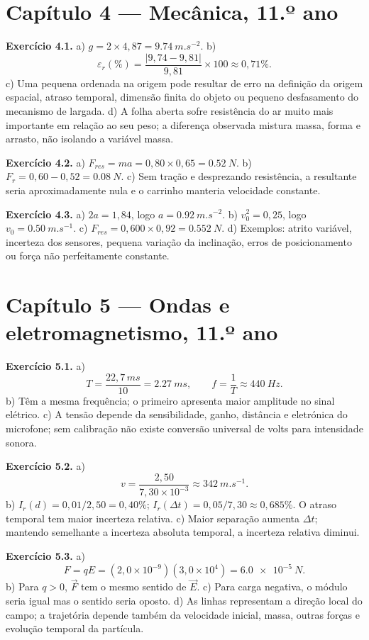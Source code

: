 \documentclass[11pt,a4paper,openany]{book}
\begin{document}
\section*{Capítulo 4 — Mecânica, 11.º ano}

\textbf{Exercício 4.1.} a) $g=2\times4,87=\SI{9.74}{m.s^{-2}}$. b)
\[
\varepsilon_r(\%)=\frac{|9,74-9,81|}{9,81}\times100\approx0,71\%.
\]
c) Uma pequena ordenada na origem pode resultar de erro na definição da origem espacial, atraso temporal, dimensão finita do objeto ou pequeno desfasamento do mecanismo de largada. d) A folha aberta sofre resistência do ar muito mais importante em relação ao seu peso; a diferença observada mistura massa, forma e arrasto, não isolando a variável massa.

\medskip
\textbf{Exercício 4.2.} a) $F_{res}=ma=0,80\times0,65=\SI{0.52}{N}$. b) $F_r=0,60-0,52=\SI{0.08}{N}$. c) Sem tração e desprezando resistência, a resultante seria aproximadamente nula e o carrinho manteria velocidade constante.

\medskip
\textbf{Exercício 4.3.} a) $2a=1,84$, logo $a=\SI{0.92}{m.s^{-2}}$. b) $v_0^2=0,25$, logo $v_0=\SI{0.50}{m.s^{-1}}$. c) $F_{res}=0,600\times0,92=\SI{0.552}{N}$. d) Exemplos: atrito variável, incerteza dos sensores, pequena variação da inclinação, erros de posicionamento ou força não perfeitamente constante.

\section*{Capítulo 5 — Ondas e eletromagnetismo, 11.º ano}

\textbf{Exercício 5.1.} a)
\[
T=\frac{22,7\,\si{ms}}{10}=\SI{2.27}{ms},\qquad
f=\frac1T\approx\SI{440}{Hz}.
\]
b) Têm a mesma frequência; o primeiro apresenta maior amplitude no sinal elétrico. c) A tensão depende da sensibilidade, ganho, distância e eletrónica do microfone; sem calibração não existe conversão universal de volts para intensidade sonora.

\medskip
\textbf{Exercício 5.2.} a)
\[
v=\frac{2,50}{7,30\times10^{-3}}\approx\SI{342}{m.s^{-1}}.
\]
b) $I_r(d)=0,01/2,50=0,40\%$; $I_r(\Delta t)=0,05/7,30\approx0,685\%$. O atraso temporal tem maior incerteza relativa. c) Maior separação aumenta $\Delta t$; mantendo semelhante a incerteza absoluta temporal, a incerteza relativa diminui.

\medskip
\textbf{Exercício 5.3.} a)
\[
F=qE=(2,0\times10^{-9})(3,0\times10^4)=\SI{6.0e-5}{N}.
\]
b) Para $q>0$, $\vec F$ tem o mesmo sentido de $\vec E$. c) Para carga negativa, o módulo seria igual mas o sentido seria oposto. d) As linhas representam a direção local do campo; a trajetória depende também da velocidade inicial, massa, outras forças e evolução temporal da partícula.
\end{document}

